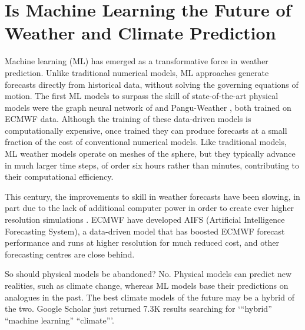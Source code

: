 \section{Is Machine Learning the Future of Weather and Climate Prediction}

Machine learning (ML) has emerged as a transformative force in weather
prediction. Unlike traditional numerical models, ML approaches generate
forecasts directly from historical data, without solving the governing
equations of motion. The first ML models to surpass the skill of state-of-the-art
physical models were the graph neural network of \citet{Keis22} and
Pangu-Weather \citep{BXZ+22}, both trained on ECMWF data. Although
the training of these data-driven models is computationally expensive,
once trained they can produce forecasts at a small fraction of the
cost of conventional numerical models. Like traditional models, ML
weather models operate on meshes of the sphere, but they typically
advance in much larger time steps, of order six hours rather than
minutes, contributing to their computational efficiency.

This century, the improvements to skill in weather forecasts have
been slowing, in part due to the lack of additional computer power
in order to create ever higher resolution simulations \citep[as shown by][for the ECMWF model]{Baue24}.
ECMWF have developed AIFS (Artificial Intelligence Forecasting System),
a data-driven model that has boosted ECMWF forecast performance and
runs at higher resolution for much reduced cost, and other forecasting
centres are close behind. 

So should physical models be abandoned? No. Physical models can predict
new realities, such as climate change, whereas ML models base their
predictions on analogues in the past. The best climate models of the
future may be a hybrid of the two. Google Scholar just returned 7.3K
results searching for `{}``hybrid'' ``machine learning'' ``climate'''.
